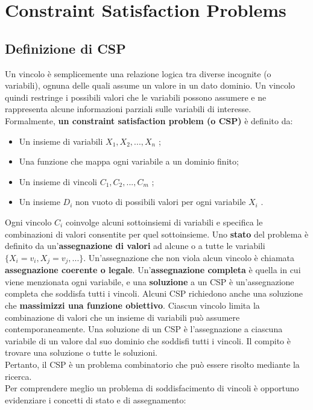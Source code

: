 \chapter{Constraint Satisfaction Problems}

\section{Definizione di CSP}
Un vincolo è semplicemente una relazione logica tra diverse incognite (o
variabili), ognuna delle quali assume un valore in un dato dominio. Un vincolo
quindi restringe i possibili valori che le variabili possono assumere e ne
rappresenta alcune informazioni parziali sulle variabili di interesse.
\\Formalmente, \textbf{un constraint satisfaction problem (o CSP)} è definito da:
\begin{itemize}
    \item Un insieme di variabili $X_1, X_2, ... , X_n$ ;
    \item Una funzione che mappa ogni variabile a un dominio finito;
    \item Un insieme di vincoli $C_1, C_2, ... , C_m$ ;
    \item Un insieme $D_i$ non vuoto di possibili valori per ogni variabile
          $X_i$ .
\end{itemize}
Ogni vincolo $C_i$ coinvolge alcuni sottoinsiemi di variabili e specifica le
combinazioni di valori consentite per quel sottoinsieme. Uno \textbf{stato} del
problema è definito da un'\textbf{assegnazione di valori }ad alcune o a tutte le
variabili $\{X_i = v_i , X_j = v_j, ... \}.$ Un'assegnazione che non viola alcun
vincolo è chiamata \textbf{assegnazione coerente o legale}.
Un'\textbf{assegnazione completa} è quella in cui viene menzionata ogni
variabile, e una \textbf{soluzione} a un CSP è un'assegnazione completa che
soddisfa tutti i vincoli. Alcuni CSP richiedono anche una soluzione che
\textbf{massimizzi una funzione obiettivo}. Ciascun vincolo limita la
combinazione di valori che un insieme di variabili può assumere
contemporaneamente. Una soluzione di un CSP è l'assegnazione a ciascuna
variabile di un valore dal suo dominio che soddisfi tutti i vincoli. Il compito
è trovare una soluzione o tutte le soluzioni. \\
Pertanto, il CSP è un problema combinatorio che può essere risolto mediante la
ricerca. \\
Per comprendere meglio un problema di soddisfacimento di vincoli è opportuno
evidenziare i concetti di stato e di assegnamento:
